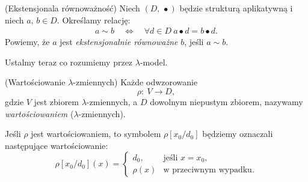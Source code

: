 \begin{definicja}\label{def:extens-equiv}(Ekstensjonala równoważność) %
Niech \((D,\,\bullet)\) będzie strukturą aplikatywną i niech \(a,\,b\in D\). Określamy relację: 
\begin{align*}
a \sim b \quad \iff\quad \forall d \in D\  a \bullet d = b \bullet d.
\end{align*}
Powiemy, że \(a\) jest \emph{ekstensjonalnie równoważne} \(b\), jeśli \(a\sim b\).
\end{definicja}

Ustalmy teraz co rozumiemy przez \(\lambda\)-model.

\begin{definicja}(Wartościowanie \(\lambda\)-zmiennych) Każde odwzorowanie \[\rho:\:V\to D,\] gdzie \(V\) jest zbiorem \(\lambda\)-zmiennych, a \(D\) dowolnym niepustym zbiorem, nazywamy \emph{wartościowaniem} (\(\lambda\)-zmiennych).

  Jeśli \(\rho\) jest wartościowaniem, to symbolem \(\rho[x_0/d_0]\) będziemy 
  oznaczali następujące wartościowanie:
  \[
    \rho[x_0/d_0](x) = \begin{cases}
        d_0, & \text{jeśli } x=x_0, \\
      \rho(x) & \text{w przeciwnym wypadku}.
    \end{cases}
  \]
\end{definicja}

